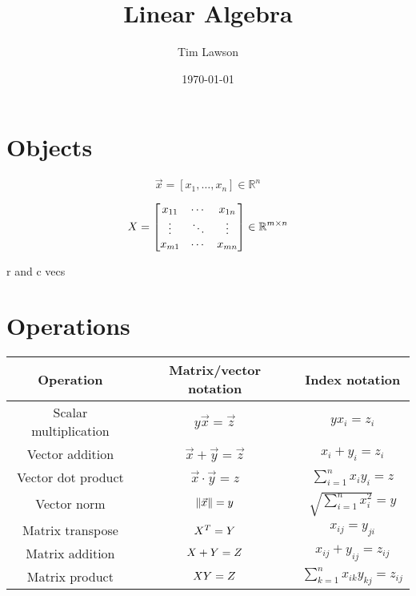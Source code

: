 \documentclass[a4paper]{extarticle}
\title{Linear Algebra}
\author{Tim Lawson}
\date{\today}
\begin{document}
\maketitle

\section{Objects}

\begin{dfn}[Vector]
  $$
    \vec{x} = \left[ x_{1}, \ldots, x_{n} \right]
    \in \mathbb{R}^{n}
  $$
\end{dfn}

\begin{dfn}[Matrix]
  $$
    X =
    \left[
      \begin{matrix}
        x_{11} & \cdots & x_{1n}
        \\
        \vdots & \ddots & \vdots
        \\
        x_{m1} & \cdots & x_{mn}
      \end{matrix}
      \right]
    \in \mathbb{R}^{m \times n}
  $$
\end{dfn}

r and c vecs

\section{Operations}

\begin{center}
  \begin{tabular}{ccc}
    Operation
     & Matrix/vector notation
     & Index notation
    \\
    \hline
    Scalar multiplication
     & $y \vec{x} = \vec{z}$
     & $y x_{i} = z_{i}$
    \\
    Vector addition
     & $\vec{x} + \vec{y} = \vec{z}$
     & $x_{i} + y_{i} = z_{i}$
    \\
    Vector dot product
     & $\vec{x} \cdot \vec{y} = z$
     & $\sum_{i = 1}^{n} x_{i} y_{i} = z$
    \\
    Vector norm
     & $\lVert \vec{x} \rVert = y$
     & $\sqrt{\sum_{i = 1}^{n} x_{i}^2} = y$
    \\
    Matrix transpose
     & $X^{T} = Y$
     & $x_{ij} = y_{ji}$
    \\
    Matrix addition
     & $X + Y = Z$
     & $x_{ij} + y_{ij} = z_{ij}$
    \\
    Matrix product
     & $X Y = Z$
     & $\sum_{k = 1}^{n} x_{ik} y_{kj} = z_{ij}$
    \\
  \end{tabular}
\end{center}
\end{document}
